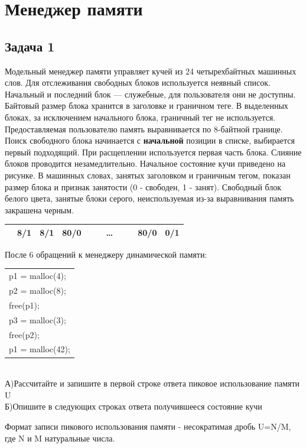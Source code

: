 \documentclass[12pt, letterpaper]{article}
\begin{document}
\section{Менеджер памяти}
\subsection{Задача 1}
Модельный менеджер памяти управляет кучей из 24 четырехбайтных машинных слов. Для отслеживания свободных блоков используется неявный список. Начальный и последний блок — служебные, для пользователя они не доступны. Байтовый размер блока хранится в заголовке и граничном теге. В выделенных блоках, за исключением начального блока, граничный тег не используется. Предоставляемая пользователю память выравнивается по 8-байтной границе. Поиск свободного блока начинается с \textbf{начальной} позиции в списке, выбирается первый подходящий. При расщеплении используется первая часть блока. Слияние блоков проводится незамедлительно. Начальное состояние кучи приведено на рисунке. В машинных словах, занятых заголовком и граничным тегом, показан размер блока и признак занятости (0 - свободен, 1 - занят). Свободный блок белого цвета, занятые блоки серого, неиспользуемая из-за выравнивания память закрашена черным.
\begin{center}
    \begin{tabular}{|c|c|c|c|c|c|c|c|c|c|c|}
        \hline
         \cellcolor{black} & \cellcolor[gray]{0.9} 8/1 & \cellcolor[gray]{0.9} 8/1 & 80/0 & & & \dots & & & 80/0 & 0/1 \\
        \hline
    \end{tabular}
\end{center}
После 6 обращений к менеджеру динамической памяти:\\
\begin{tabular}{l}
    p1 = malloc(4);\\
    p2 = malloc(8);\\
    free(p1);\\
    p3 = malloc(3);\\
    free(p2);\\
    p1 = malloc(42);\\
\end{tabular}\\
\noindent А)Рассчитайте и запишите в первой строке ответа пиковое использование памяти U\\
Б)Опишите в следующих строках ответа получившееся состояние кучи

Формат записи пикового использования памяти - несократимая дробь U=N/M, где N и M натуральные числа.
\end{document}
